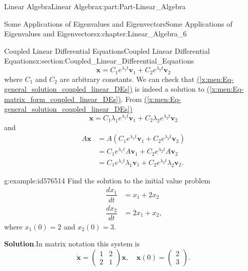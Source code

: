 \documentclass[oneside,10pt,]{book}
\newcommand{\blocktitlefont}{\relax}
\newcommand{\xreffont}{\relax}
\numberwithin{equation}{section}
\newcommand{\bm}[1]{\boldsymbol{#1}}
\newcommand{\amp}{&}
\begin{document}
\begin{partptx}{Linear Algebra}{}{Linear Algebra}{}{}{x:part:Part-Linear_Algebra}
\begin{chapterptx}{Some Applications of Eigenvalues and Eigenvectors}{}{Some Applications of Eigenvalues and Eigenvectors}{}{}{x:chapter:Linear_Algebra_6}
\begin{sectionptx}{Coupled Linear Differential Equations}{}{Coupled Linear Differential Equations}{}{}{x:section:Coupled_Linear_Differential_Equations}
\begin{equation}
\bm{x} = C_1 e^{\lambda_1 t} \bm{v}_1 + C_2 e^{\lambda_2 t} \bm{v}_2\label{x:men:Eq-general_solution_coupled_linear_DEs}
\end{equation}
where \(C_1\) and \(C_2\) are arbitrary constants. We can check that \hyperref[x:men:Eq-general_solution_coupled_linear_DEs]{({\xreffont\ref{x:men:Eq-general_solution_coupled_linear_DEs}})} is indeed a solution to \hyperref[x:men:Eq-matrix_form_coupled_linear_DEs]{({\xreffont\ref{x:men:Eq-matrix_form_coupled_linear_DEs}})}. From \hyperref[x:men:Eq-general_solution_coupled_linear_DEs]{({\xreffont\ref{x:men:Eq-general_solution_coupled_linear_DEs}})}%
\begin{equation*}
\bm{x} = C_1 \lambda_1 e^{\lambda_1 t} \bm{v}_1 + C_2 \lambda_2 e^{\lambda_2 t} \bm{v}_2
\end{equation*}
and%
\begin{align*}
A \bm{x} \amp = A \left( C_1 e^{\lambda_1 t} \bm{v}_1 + C_2 e^{\lambda_2 t} \bm{v}_2 \right)\\
\amp = C_1 e^{\lambda_1 t} A \bm{v}_1 + C_2 e^{\lambda_2 t} A \bm{v}_2\\
\amp = C_1 e^{\lambda_1 t} \lambda_1 \bm{v}_1 + C_2 e^{\lambda_2 t} \lambda_2 \bm{v}_2\text{.}
\end{align*}
%
\begin{example}{}{g:example:id576514}%
Find the solution to the initial value problem%
\begin{align*}
\dfrac{dx_1}{dt} \amp = x_1 + 2x_2\\
\dfrac{dx_2}{dt} \amp = 2x_1 + x_2\text{,}
\end{align*}
where \(x_1(0) = 2\) and \(x_2(0) = 3\).%
\par\smallskip%
\noindent\textbf{\blocktitlefont Solution}.\hypertarget{g:solution:id576548}{}\quad{}In matrix notation this system is%
\begin{equation*}
\dot{\bm{x}} = \begin{pmatrix} 1 \amp 2 \\ 2 \amp 1 \end{pmatrix} \bm{x}, \quad \bm{x}(0) = \begin{pmatrix} 2 \\ 3 \end{pmatrix}\text{.}
\end{equation*}

\end{example}
\end{sectionptx}
\end{chapterptx}
\end{partptx}
\end{document}
